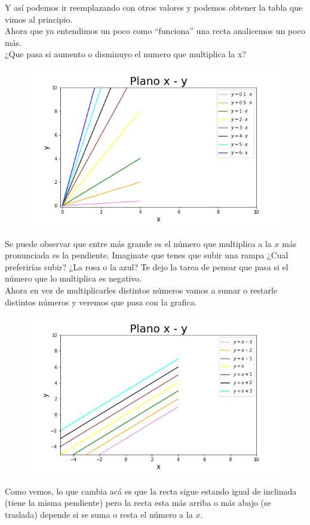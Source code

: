 \documentclass{article}
\begin{document}
Y así podemos ir reemplazando con otros valores y podemos obtener la tabla que vimos al principio.\\
Ahora que ya entendimos un poco como ``funciona” una recta analicemos un poco más.\\
¿Que pasa si aumento o disminuyo el numero que multiplica la x?\\
\begin{figure}[h!]
\includegraphics[scale=0.5]{Imagenes/distintas_pendientes.png}
\centering
\end{figure}
\newpage
Se puede observar que entre más grande es el número que multiplica a la $x$
 más pronunciada es la pendiente. Imaginate que tenes que subir una rampa ¿Cual preferirías subir? ¿La rosa o la azul? Te dejo la tarea de pensar que pasa si el número que lo multiplica es negativo.\\
 Ahora en vez de multiplicarles distintos números vamos a sumar o restarle distintos números y veremos que pasa con la grafica.\\
\begin{figure}[h!]
\includegraphics[scale=0.5]{Imagenes/distinta_ordenada_al_origen.png}
\centering
\end{figure}
\newline
Como vemos, lo que cambia acá es que la recta sigue estando igual de inclinada (tiene la misma pendiente) pero la recta esta más arriba o más abajo (se traslada) depende si se suma o resta el número a la $x$.\\
\end{document}
